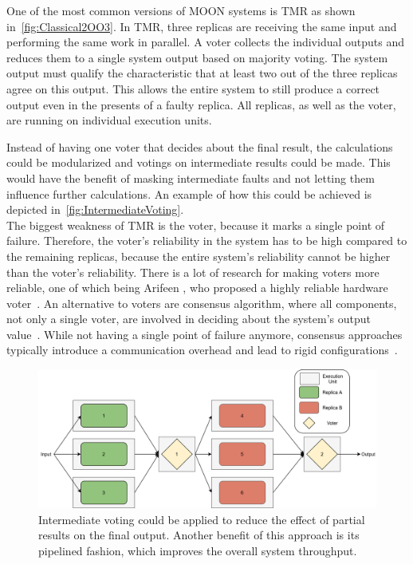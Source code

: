 One of the most common versions of \gls*{MOON} systems is \gls*{TMR} as shown in~\autoref{fig:Classical2OO3}.
In \gls*{TMR}, three replicas are receiving the same input and performing the same work in parallel.
A voter collects the individual outputs and reduces them to a single system output based on majority voting.
The system output must qualify the characteristic that at least two out of the three replicas agree on this output.
This allows the entire system to still produce a correct output even in the presents of a faulty replica.
All replicas, as well as the voter, are running on individual execution units.

Instead of having one voter that decides about the final result, the calculations could be modularized and votings on intermediate results could be made.
This would have the benefit of masking intermediate faults and not letting them influence further calculations.
An example of how this could be achieved is depicted in~\autoref{fig:IntermediateVoting}.
\\

The biggest weakness of \gls*{TMR} is the voter, because it marks a single point of failure.
Therefore, the voter's reliability in the system has to be high compared to the remaining replicas, because the entire system's reliability cannot be higher than the voter's reliability.
There is a lot of research for making voters more reliable, one of which being Arifeen \etal, who proposed a highly reliable hardware voter~\cite{ArifeenFaultTolerantTMR}.
An alternative to voters are consensus algorithm, where all components, not only a single voter, are involved in deciding about the system's output value~\cite{lamport2001paxos}.
While not having a single point of failure anymore, consensus approaches typically introduce a communication overhead and lead to rigid configurations~\cite{GamerIncreasingMOON}.

\begin{figure}[!hb]
	\centering
	\includegraphics[width=0.75\linewidth]{images/IntermediateVoting}
	\caption{Intermediate voting could be applied to reduce the effect of partial results on the final output. Another benefit of this approach is its pipelined fashion, which improves the overall system throughput.}
	\label{fig:IntermediateVoting}
\end{figure}

